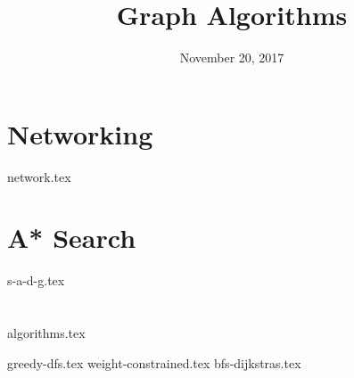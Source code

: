 \documentclass[11pt]{exam}
\title{Graph Algorithms}
\date{November 20, 2017}
\begin{document}
\maketitle

\section{Networking}
\begin{questions}
{network.tex}
\end{questions}

\clearpage

\section{A* Search}
\begin{questions}
{s-a-d-g.tex}
\end{questions}

\clearpage

\section{}
{algorithms.tex}
\begin{questions}
{greedy-dfs.tex}
{weight-constrained.tex}
{bfs-dijkstras.tex}
\end{questions}
\end{document}
